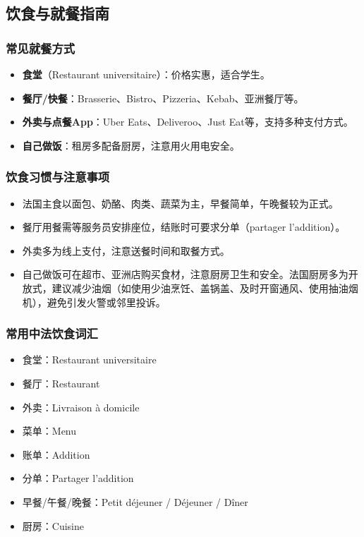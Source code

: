 \subsection{饮食与就餐指南}

\subsubsection{常见就餐方式}
\begin{itemize}
    \item \textbf{食堂}（Restaurant universitaire）：价格实惠，适合学生。
    \item \textbf{餐厅/快餐}：Brasserie、Bistro、Pizzeria、Kebab、亚洲餐厅等。
    \item \textbf{外卖与点餐App}：Uber Eats、Deliveroo、Just Eat等，支持多种支付方式。
    \item \textbf{自己做饭}：租房多配备厨房，注意用火用电安全。
\end{itemize}

\subsubsection{饮食习惯与注意事项}
\begin{itemize}
    \item 法国主食以面包、奶酪、肉类、蔬菜为主，早餐简单，午晚餐较为正式。
    \item 餐厅用餐需等服务员安排座位，结账时可要求分单（partager l’addition）。
    \item 外卖多为线上支付，注意送餐时间和取餐方式。
    \item 自己做饭可在超市、亚洲店购买食材，注意厨房卫生和安全。法国厨房多为开放式，建议减少油烟（如使用少油烹饪、盖锅盖、及时开窗通风、使用抽油烟机），避免引发火警或邻里投诉。
\end{itemize}

\subsubsection{常用中法饮食词汇}
\begin{itemize}
    \item 食堂：Restaurant universitaire
    \item 餐厅：Restaurant
    \item 外卖：Livraison à domicile
    \item 菜单：Menu
    \item 账单：Addition
    \item 分单：Partager l’addition
    \item 早餐/午餐/晚餐：Petit déjeuner / Déjeuner / Dîner
    \item 厨房：Cuisine
\end{itemize}
